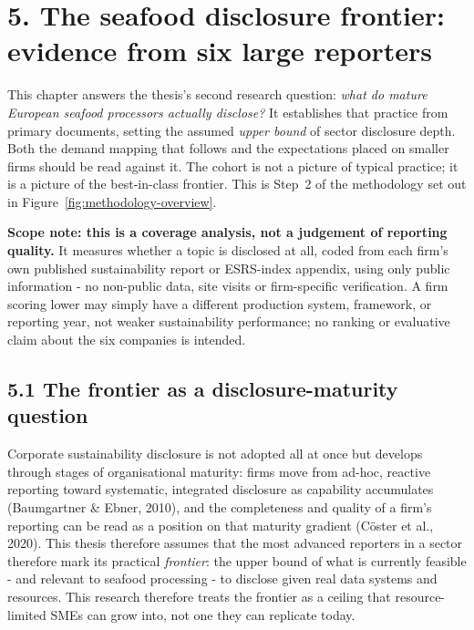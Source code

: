 \section{5. The seafood disclosure frontier: evidence from six large
reporters}\label{cohort-analysis}

This chapter answers the thesis's second research question: \emph{what do mature
European seafood processors actually disclose?} It establishes that practice from primary documents, setting the assumed \textit{upper bound} of sector disclosure depth. Both the demand mapping that follows and the expectations placed on smaller firms should be read against it. The cohort is not
a picture of typical practice; it is a picture of the best-in-class frontier.
This is Step~2 of the methodology set out in
Figure~\ref{fig:methodology-overview}.

\textbf{Scope note: this is a coverage analysis, not a judgement of reporting
quality.} It measures whether a topic is disclosed at all, coded from each
firm's own published sustainability report or ESRS-index appendix, using
only public information - no non-public data, site visits or firm-specific
verification. A firm scoring lower may simply have a different production
system, framework, or reporting year, not weaker sustainability performance;
no ranking or evaluative claim about the six companies is intended.

\FloatBarrier
\subsection{5.1 The frontier as a disclosure-maturity
question}\label{cohort-theory}

Corporate sustainability disclosure is not adopted all at once but develops
through stages of organisational maturity: firms move from ad-hoc, reactive
reporting toward systematic, integrated disclosure as capability accumulates
(Baumgartner \& Ebner, 2010),
and the completeness and quality of a firm's
reporting can be read as a position on that maturity gradient (C\"oster et al.,
2020).
This thesis therefore assumes that the most advanced reporters in a sector therefore mark its practical
\emph{frontier}: the upper bound of what is currently feasible - and relevant to
seafood processing - to disclose given real data systems and resources. This research therefore treats the frontier as a ceiling that resource-limited
SMEs can grow into, not one they can replicate today.

